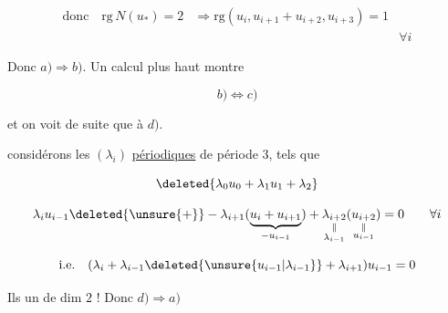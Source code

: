 
\[
\begin{aligned}
\text{donc}\quad\mathrm{rg}\,N(u_*)=2&\Rightarrow
 \mathrm{rg}(u_i,u_{i+1}+u_{i+2},u_{i+3})=1\\
&&\forall i
\end{aligned}
\]

Donc $a)\Rightarrow b)$. Un calcul  plus haut montre

\[
b)\Longleftrightarrow c)
\]

et on voit  de suite que   à $d)$.

 considérons les $(\lambda_i)$ \uline{périodiques} de période $3$, tels que

\[
\deleted{\lambda_0u_0+\lambda_1u_1+\lambda_2}
\]

\[
\lambda_i u_{i-1}\deleted{\unsure{+}}-\lambda_{i+1}
(\underbrace{u_i+u_{i+1}}_{-u_{i-1}})+
\underset{\substack{\Vert\\\lambda_{i-1}}}{\lambda_{i+2}}
(\underset{\substack{\Vert\\u_{i-1}}}{u_{i+2}})=0\qquad\forall i
\]

\[
\text{i.e.}\quad
(\lambda_i+\lambda_{i-1}\deleted{\unsure{u_{i-1}|\lambda_{i-1}}}+\lambda_{i+1})u_{i-1}=0
\]

Ils  un  de dim $2$ ! Donc $d)\Rightarrow a)$

